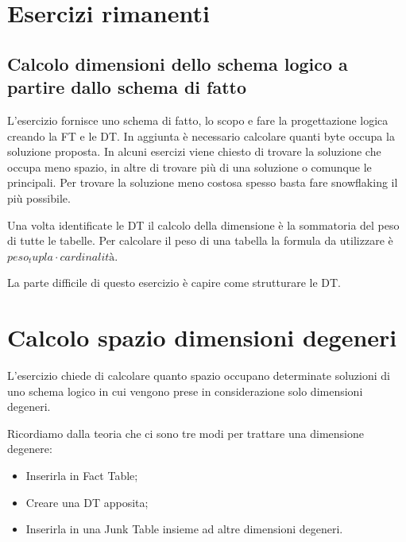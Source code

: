 \section{Esercizi rimanenti}
\subsection{Calcolo dimensioni dello schema logico a partire dallo schema di fatto}
L'esercizio fornisce uno schema di fatto, lo scopo e fare la progettazione logica creando la FT e le DT. In aggiunta è necessario calcolare quanti byte occupa la soluzione proposta. In alcuni esercizi viene chiesto di trovare la soluzione che occupa meno spazio, in altre di trovare più di una soluzione o comunque le principali. Per trovare la soluzione meno costosa spesso basta fare snowflaking il più possibile.\newline

\noindent Una volta identificate le DT il calcolo della dimensione è la sommatoria del peso di tutte le tabelle. Per calcolare il peso di una tabella la formula da utilizzare è $peso_tupla \cdot cardinalità$.\newline

\noindent La parte difficile di questo esercizio è capire come strutturare le DT.


\section{Calcolo spazio dimensioni degeneri}
L'esercizio chiede di calcolare quanto spazio occupano determinate soluzioni di uno schema logico in cui vengono prese in considerazione solo dimensioni degeneri.

\noindent Ricordiamo dalla teoria che ci sono tre modi per trattare una dimensione degenere:
\begin{itemize}
	\item Inserirla in Fact Table;
	\item Creare una DT apposita;
	\item Inserirla in una Junk Table insieme ad altre dimensioni degeneri.
\end{itemize}

